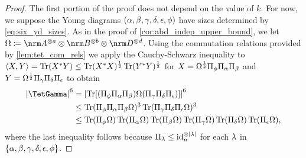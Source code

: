 \documentclass[notitlepage, 10pt]{article}
\begin{document}
\begin{proof}
    The first portion of the proof does not depend on the value of $k$.
    For now, we suppose the Young diagrams $(\alpha,\beta,\gamma,\delta,\epsilon,\phi)$ have sizes determined by \cref{eq:six_yd_sizes}.
    As in the proof of \cref{cor:abd_indep_upper_bound}, we let $\Omega \coloneqq \nrm A^{\ot a} \ot \nrm B^{\ot b} \ot \nrm D^{\ot d}$.
    Using the commutation relations provided by \cref{lem:tet_com_rels} we apply the Cauchy-Schwarz inequality to $\braket{X,Y} = \operatorname{Tr}(X^{*} Y) \leq \operatorname{Tr}(X^{*}X)^{\frac{1}{2}}\operatorname{Tr}(Y^{*}Y)^{\frac{1}{2}}$ for $X = \Omega^{\frac{1}{2}}\Pi_{\phi}\Pi_{\alpha}\Pi_{\beta}$ and $Y = \Omega^{\frac{1}{2}}\Pi_{\gamma} \Pi_{\delta} \Pi_{\epsilon}$ to obtain
    \begin{align}
        \begin{split}
            \abs{\TetGamma}^{6}
            &=\abs{\Tr[(\Pi_{\yf}\Pi_{\ya}\Pi_{\yb}) \Omega (\Pi_{\yc} \Pi_{\yd} \Pi_{\ye})]}^6\\
            &\leq
            \Tr(\Pi_{\yf}\Pi_{\ya}\Pi_{\yb} \Omega)^3
            \Tr(\Pi_{\yc}\Pi_{\yd}\Pi_{\ye} \Omega)^3\\
            &\leq
            \Tr(\Pi_{\yf}\Omega)\Tr(\Pi_{\ya}\Omega)\Tr(\Pi_{\yb} \Omega)
            \Tr(\Pi_{\yc}\Omega)\Tr(\Pi_{\yd}\Omega)\Tr(\Pi_{\ye} \Omega),
        \end{split}
    \end{align}
    where the last inequality follows because $\Pi_{\lambda} \leq \operatorname{id}_n^{\otimes \left|\lambda\right|}$ for each $\lambda$ in $\{\alpha,\beta,\gamma,\delta,\epsilon,\phi\}$.


\end{proof}
\end{document}
